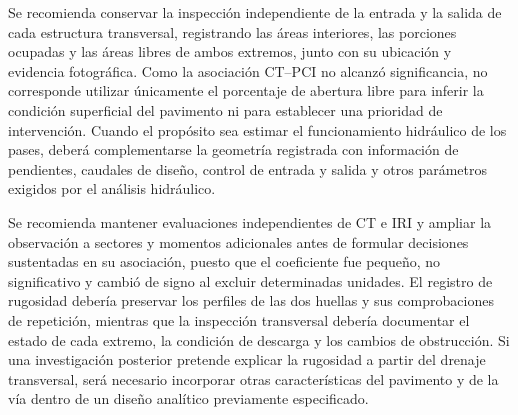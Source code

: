 
Se recomienda conservar la inspección independiente de la entrada y la salida de cada estructura transversal, registrando las áreas interiores, las porciones ocupadas y las áreas libres de ambos extremos, junto con su ubicación y evidencia fotográfica. Como la asociación CT--PCI no alcanzó significancia, no corresponde utilizar únicamente el porcentaje de abertura libre para inferir la condición superficial del pavimento ni para establecer una prioridad de intervención. Cuando el propósito sea estimar el funcionamiento hidráulico de los pases, deberá complementarse la geometría registrada con información de pendientes, caudales de diseño, control de entrada y salida y otros parámetros exigidos por el análisis hidráulico.


Se recomienda mantener evaluaciones independientes de CT e IRI y ampliar la observación a sectores y momentos adicionales antes de formular decisiones sustentadas en su asociación, puesto que el coeficiente fue pequeño, no significativo y cambió de signo al excluir determinadas unidades. El registro de rugosidad debería preservar los perfiles de las dos huellas y sus comprobaciones de repetición, mientras que la inspección transversal debería documentar el estado de cada extremo, la condición de descarga y los cambios de obstrucción. Si una investigación posterior pretende explicar la rugosidad a partir del drenaje transversal, será necesario incorporar otras características del pavimento y de la vía dentro de un diseño analítico previamente especificado.

\endgroup
